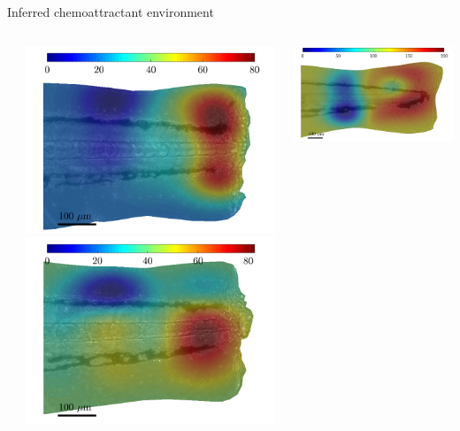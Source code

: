 \documentclass[mathserif,11pt]{beamer}
\begin{document}
\begin{frame}{Inferred chemoattractant environment}
\begin{columns}
\begin{column}{0.3\textwidth}
	\end{column}
	\begin{column}{0.3\textwidth}
		\includegraphics[scale=0.18]{Figures/severe1_field.png}
		\vspace{0.3cm}
		\includegraphics[scale=0.18]{Figures/severe2_field.png}
	\end{column}
	\begin{column}{0.3\textwidth}
		\includegraphics[scale=0.14]{Figures/mild1_field.png}

\end{column}
\end{columns}
\end{frame}
\end{document}
